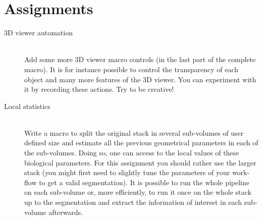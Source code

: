 \section{Assignments}

\begin{description}
\item[3D viewer automation] \hfill \\
Add some more 3D viewer macro controls (in the last part of the complete macro). It is for instance possible to control the transparency of each object and many more features of the 3D viewer. You can experiment with it by recording these actions. Try to be creative!
\item[Local statistics] \hfill \\
Write a macro to split the original stack in several sub-volumes of user defined size and estimate all the previous geometrical parameters in each of the sub-volumes. Doing so, one can access to the local values of these biological parameters. For this assignment you should rather use the larger stack (you might first need to slightly tune the parameters of your work-flow to get a valid segmentation). It is possible to run the whole pipeline on each sub-volume or, more efficiently, to run it once on the whole stack up to the segmentation and extract the information of interest in each sub-volume afterwards. 
\end{description}